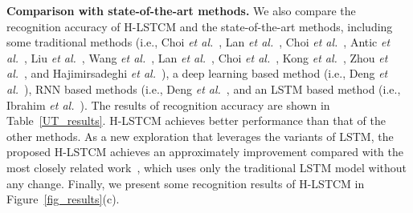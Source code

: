 \documentclass[9pt,journal,letterpaper,twocolumn]{IEEEtran}
\begin{document}
	


	
	

	
	
	{\bf Comparison with state-of-the-art methods.} We also compare the recognition accuracy of H-LSTCM and the state-of-the-art methods, including some traditional methods (i.e., Choi {\em et al.}~\cite{choi2009they}, Lan {\em et al.}~\cite{lan2010retrieving}, Choi {\em et al.}~\cite{choi2011learning}, Antic {\em et al.}~\cite{antic2014learning}, Liu {\em et al.}~\cite{liu2011recognizing}, Wang  {\em et al.}~\cite{wang2017a}, Lan {\em et al.}~\cite{lan2012discriminative}, Choi {\em et al.}~\cite{choi2012unified}, Kong {\em et al.}~\cite{kong2014interactive}, Zhou {\em et al.}~\cite{zhou2016generative}, and Hajimirsadeghi {\em et al.}~\cite{hajimirsadeghi2016multi-instance}), a deep learning based method (i.e., Deng {\em et al.}~\cite{deng2015deep}), RNN based methods (i.e., Deng {\em et al.}~\cite{deng2016structure,ibrahim2015hierarchical}, and an LSTM based method (i.e., Ibrahim {\em et al.}~\cite{ibrahim2015hierarchical}).
	The results of recognition accuracy are shown in Table~\ref{UT_results}. H-LSTCM achieves better performance than that of the other methods. As a new exploration that leverages the variants of LSTM, the proposed H-LSTCM achieves an approximately  improvement compared with the most closely related work~\cite{ibrahim2015hierarchical}, which uses only the traditional LSTM model without any change. Finally, we present some recognition results of H-LSTCM in Figure~\ref{fig_results}(c).
	
	
	
	
	


	
	
\end{document}
